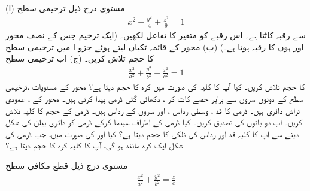 \\
(ا)  مستوی    درج ذیل ترخیمی سطح
 \begin{align*}
x^2+\tfrac{y^2}{4}+\tfrac{z^2}{9}=1
\end{align*}
 سے رقبہ  کاٹتا ہے۔ اس رقبے  کو متغیر  کا تفاعل لکھیں۔ (ایک ترخیم جس کے نصف محور  اور  ہوں کا رقبہ  ہوتا ہے۔)     (ب) محور  کے قائمہ   ٹکیاں  لیتے ہوئے  جزو-ا میں ترخیمی سطح کا حجم تلاش کریں۔ (ج) اب ترخیمی سطح 
\begin{align*}
\tfrac{x^2}{a^2}+\tfrac{y^2}{b^2}+\tfrac{z^2}{c^2}=1
\end{align*}
 کا حجم تلاش کریں۔ کیا آپ کا کلیہ  کی صورت میں کرہ کا حجم دیتا ہے؟ 
محور  کے  مستویات ،ترخیمی  سطح کے دونوں سروں سے   برابر حصے کاٹ کر ، دکھائی  گئی  ڈرمی    پیدا کرتی ہیں۔ محور  کے  ، عمودی تراش دائری ہیں۔  ڈرمی  کا قد ،  وسطی رداس  ، اور سروں کے رداس  ہیں۔ ڈرمی کے حجم کا کلیہ تلاش کریں۔ اب دو باتوں  کی تصدیق کریں۔  کیا  ڈرمی کے اطراف سیدھا کرکے ڈرمی کو  دائری بیلن   کی شکل دینے سے آپ کا کلیہ   قد اور    رداس کی نلکی کا حجم دیتا ہے؟  کیا  اور   کی صورت میں، جب   ڈرمی    کی شکل ایک کرہ مانند ہو گی، آپ کا کلیہ کرہ کا حجم دیتا ہے؟
\begin{center}
\end{center}
مستوی     درج ذیل قطع مکافی سطح
\begin{align*}
\frac{x^2}{a^2}+\frac{y^2}{b^2}=\frac{z}{c}
\end{align*}

